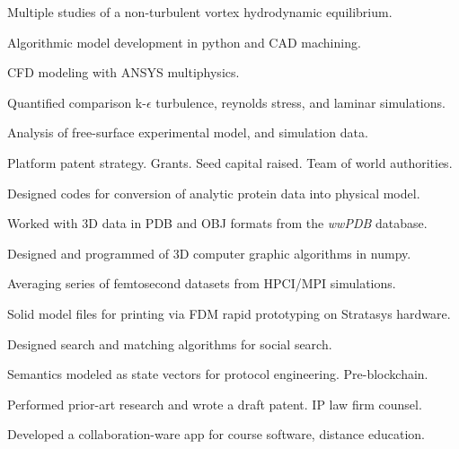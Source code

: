 \documentclass[letterpaper]{deedy-resume} %
\begin{document}
\begin{minipage}[t]{0.66\textwidth}



\vspace{\topsep} %
Multiple studies of a non-turbulent vortex hydrodynamic equilibrium.
\begin{tightitemize}
\item Algorithmic model development in python and CAD machining.
\item CFD modeling with ANSYS multiphysics.
\item Quantified comparison k-$\epsilon$ turbulence, reynolds stress, and laminar simulations.
\item Analysis of free-surface experimental model, and simulation data.
\item Platform patent strategy.  Grants. Seed capital raised. Team of world authorities.
\end{tightitemize}

\sectionspace %



\begin{tightitemize}
\item Designed codes for conversion of analytic protein data into physical model.
\item Worked with 3D data in PDB and OBJ formats from the \textit{wwPDB} database.
\item Designed and programmed of 3D computer graphic algorithms in numpy.
\item Averaging series of femtosecond datasets from HPCI/MPI simulations.
\item Solid model files for printing via FDM rapid prototyping on Stratasys hardware.
\end{tightitemize}

\sectionspace %





\begin{tightitemize}
\item Designed search and matching algorithms for social search.
\item Semantics modeled as state vectors for protocol engineering.  Pre-blockchain.
\item Performed prior-art research and wrote a draft patent. IP law firm counsel.
\item Developed a collaboration-ware app for course software, distance education.
\end{tightitemize}


\end{minipage}
\end{document}
